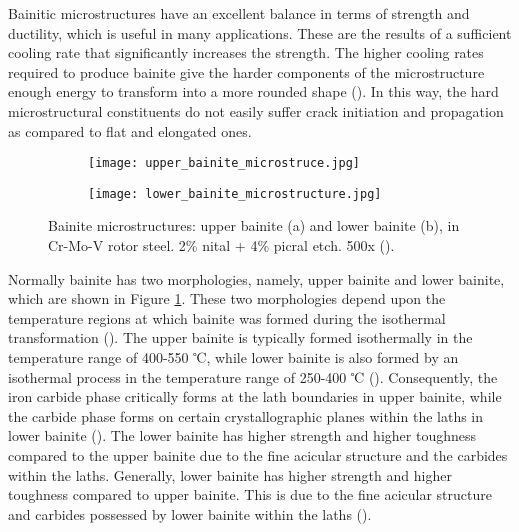 Bainitic microstructures have an excellent balance in terms of strength and ductility, which is useful in many applications. These are the results of a sufficient cooling rate that significantly increases the strength. The higher cooling rates required to produce bainite give the harder components of the microstructure enough energy to transform into a more rounded shape (\cite{bajaj2020steels}). In this way, the hard microstructural constituents do not easily suffer crack initiation and propagation as compared to flat and elongated ones.
     
\begin{figure}[H]

\centering
\begin{subfigure}{.45\textwidth}
    \centering
    \texttt{[image: upper\_bainite\_microstruce.jpg]}
    \caption{}
\end{subfigure}
\begin{subfigure}{.45\textwidth}
    \centering
    \texttt{[image: lower\_bainite\_microstructure.jpg]}
    \caption{}
\end{subfigure}

\caption{Bainite microstructures: upper bainite (a) and lower bainite (b), in Cr-Mo-V rotor steel. 2\% nital + 4\% picral etch. 500x (\cite{molabe2018determining}).}
\label{ch3:figure:bainite:microstructures}
\end{figure}

Normally bainite has two morphologies, namely, upper bainite and lower bainite, which are shown in Figure \ref{ch3:figure:bainite:microstructures}. These two morphologies depend upon the temperature regions at which bainite was formed during the isothermal transformation (\cite{molabe2018determining}). The upper bainite is typically formed isothermally in the temperature range of 400-550 ℃, while lower bainite is also formed by an isothermal process in the temperature range of 250-400 ℃ (\cite{molabe2018determining}). Consequently, the iron carbide phase critically forms at the lath boundaries in upper bainite, while the carbide phase forms on certain crystallographic planes within the laths in lower bainite (\cite{bajaj2020steels}). The lower bainite has higher strength and higher toughness compared to the upper bainite due to the fine acicular structure and the carbides within the laths. Generally, lower bainite has higher strength and higher toughness compared to upper bainite. This is due to the fine acicular structure and carbides possessed by lower bainite within the laths (\cite{molabe2018determining}).

